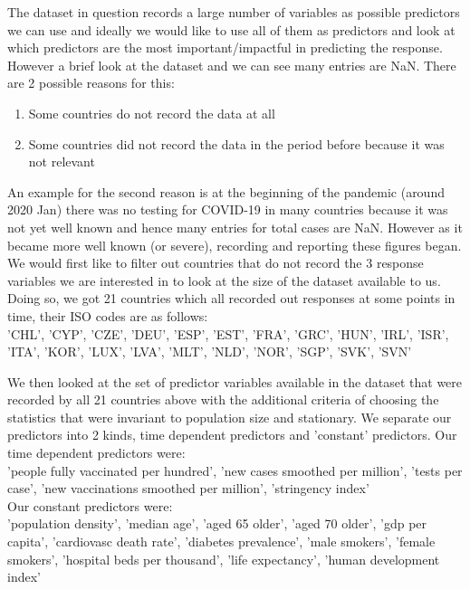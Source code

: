 \documentclass{article}
\begin{document}
The dataset in question records a large number of variables as possible predictors we can use and ideally we would like to use all of them as predictors and look at which predictors are the most important/impactful in predicting the response. However a brief look at the dataset and we can see many entries are NaN. There are 2 possible reasons for this:

\begin{enumerate}
\item Some countries do not record the data at all
\item Some countries did not record the data in the period before because it was not relevant
\end{enumerate}

An example for the second reason is at the beginning of the pandemic (around 2020 Jan) there was no testing for COVID-19 in many countries because it was not yet well known and hence many entries for total cases are NaN. However as it became more well known (or severe), recording and reporting these figures began.\\

We would first like to filter out countries that do not record the 3 response variables we are interested in to look at the size of the dataset available to us. Doing so, we got 21 countries which all recorded out responses at some points in time, their ISO codes are as follows:\\

'CHL', 'CYP', 'CZE', 'DEU', 'ESP', 'EST', 'FRA', 'GRC', 'HUN', 'IRL', 'ISR', 'ITA', 'KOR', 'LUX', 'LVA', 'MLT', 'NLD', 'NOR', 'SGP', 'SVK', 'SVN'

We then looked at the set of predictor variables available in the dataset that were recorded by all 21 countries above with the additional criteria of choosing the statistics that were invariant to population size and stationary. We separate our predictors into 2 kinds, time dependent predictors and 'constant' predictors. Our time dependent predictors were:\\

'people fully vaccinated per hundred', 'new cases smoothed per million', 'tests per case', 'new vaccinations smoothed per million', 'stringency index'\\

Our constant predictors were:\\

'population density', 'median age', 'aged 65 older', 'aged 70 older', 'gdp per capita', 'cardiovasc death rate', 'diabetes prevalence', 'male smokers', 'female smokers', 'hospital beds per thousand', 'life expectancy', 'human development index'\\
\end{document}
